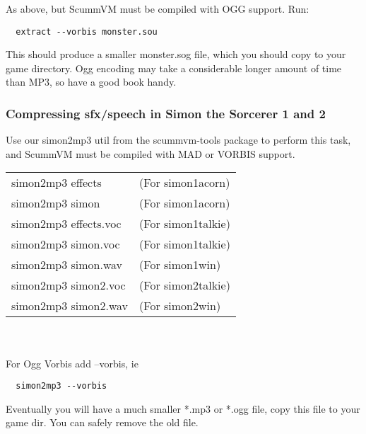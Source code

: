 As above, but ScummVM must be compiled with OGG support. Run:

\begin{verbatim}
  extract --vorbis monster.sou
\end{verbatim}
%
This should produce a smaller monster.sog file, which you should copy to your
game directory. Ogg encoding may take a considerable longer amount of time
than MP3, so have a good book handy.


\subsubsection{Compressing sfx/speech in Simon the Sorcerer 1 and 2}

Use our simon2mp3 util from the scummvm-tools package to perform
this task, and ScummVM must be compiled with MAD or VORBIS support.\\

\begin{tabular}[h]{ll}
  simon2mp3 effects    &(For simon1acorn)\\
  simon2mp3 simon      &(For simon1acorn)\\
  simon2mp3 effects.voc&(For simon1talkie)\\
  simon2mp3 simon.voc  &(For simon1talkie)\\
  simon2mp3 simon.wav  &(For simon1win)\\
  simon2mp3 simon2.voc &(For simon2talkie)\\
  simon2mp3 simon2.wav &(For simon2win)\\
\end{tabular}\\
~\\
For Ogg Vorbis add --vorbis, ie

\begin{verbatim}
  simon2mp3 --vorbis
\end{verbatim}
%
Eventually you will have a much smaller *.mp3 or *.ogg file, copy this
file to your game dir. You can safely remove the old file.

